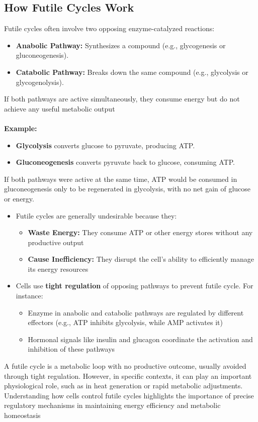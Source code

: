 \documentclass[10pt]{article}
\begin{document}
\subsection*{How Futile Cycles Work}
Futile cycles often involve two opposing enzyme-catalyzed reactions:
\begin{itemize}
	\item \textbf{Anabolic Pathway:}  Synthesizes a compound (e.g., glycogenesis or gluconeogenesis).
    \item \textbf{Catabolic Pathway:} Breaks down the same compound (e.g., glycolysis or glycogenolysis).
\end{itemize}
If both pathways are active simultaneously, they consume energy but do not achieve any useful metabolic output\\\\
\textbf{Example:}
\begin{itemize}
	\item \textbf{Glycolysis} converts glucose to pyruvate, producing ATP.
	\item \textbf{Gluconeogenesis} converts pyruvate back to glucose, consuming ATP.
\end{itemize}
If both pathways were active at the same time, ATP would be consumed in gluconeogenesis only to be regenerated in glycolysis, with no net gain of glucose or energy.
\begin{itemize}
	\item Futile cycles are generally undesirable because they:
	\begin{itemize}
        \item \textbf{Waste Energy:} They consume ATP or other energy stores without any productive output
        \item \textbf{Cause Inefficiency:} They disrupt the cell's ability to efficiently manage its energy resources
    \end{itemize}
    \item Cells use \textbf{tight regulation} of opposing pathways to prevent futile cycle.  For instance:
    \begin{itemize}
        \item Enzyme in anabolic and catabolic pathways are regulated by different effectors (e.g., ATP inhibits glycolysis, while AMP activates it)
        \item Hormonal signals like insulin and glucagon coordinate the activation and inhibition of these pathways
    \end{itemize}
\end{itemize}
A futile cycle is a metabolic loop with no productive outcome, usually avoided through tight regulation. However, in specific contexts, it can play an important physiological role, such as in heat generation or rapid metabolic adjustments. Understanding how cells control futile cycles highlights the importance of precise regulatory mechanisms in maintaining energy efficiency and metabolic homeostasis
\end{document}
